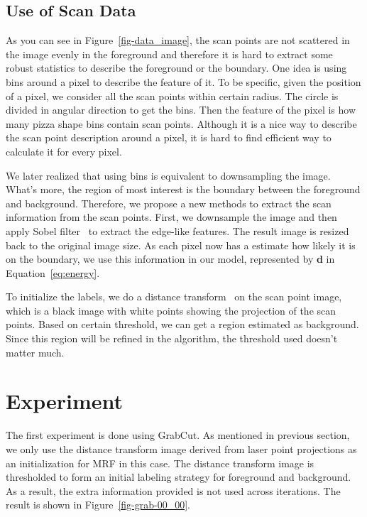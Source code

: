 \documentclass{article} %
\begin{document}
\subsection{Use of Scan Data}

As you can see in Figure~\ref{fig-data_image}, the scan points are not
scattered in the image evenly in the foreground and therefore it is
hard to extract some robust statistics to describe the foreground or
the boundary. One idea is using bins around a pixel to describe the
feature of it. To be specific, given the position of a pixel, we
consider all the scan points within certain radius. The circle is
divided in angular direction to get the bins. Then the feature of the
pixel is how many pizza shape bins contain scan points. Although it is
a nice way to describe the scan point description around a pixel, it
is hard to find efficient way to calculate it for every
pixel.

We later realized that using bins is equivalent to downsampling the
image. What's more, the region of most interest is the boundary
between the foreground and background. Therefore, we propose a new
methods to extract the scan information from the scan points. First,
we downsample the image and then apply Sobel
filter~\citep{Szeliski2010} to extract the edge-like features. The
result image is resized back to the original image size. As each pixel
now has a estimate how likely it is on the boundary, we use this
information in our model, represented by \textbf{d} in
Equation~\eqref{eq:energy}.

To initialize the labels, we do a distance
transform~\citep{Borgefors1986Distance,Felzenszwalb2004Distance} on
the scan point image, which is a black image with white points showing
the projection of the scan points. Based on certain threshold, we can
get a region estimated as background. Since this region will be
refined in the algorithm, the threshold used doesn't matter much.

\section{Experiment}
\label{sec:exp}

The first experiment is done using GrabCut. As mentioned in previous section, we only use the distance transform image derived from laser point projections as an initialization for MRF in this case. The distance transform image is thresholded to form an initial labeling strategy for foreground and background. As a result, the extra information provided is not used across iterations. The result is shown in Figure~\ref{fig-grab-00_00}. 
\end{document}
